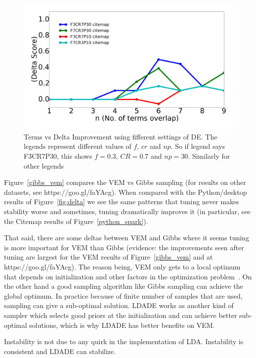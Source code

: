 \documentclass[twocolumn,5p,sort&compress]{elsarticle}
\theoremstyle{break}
\begin{document}
\begin{figure}[!t]
  \includegraphics[width=\linewidth]{./fig/citemap.png}
  \caption{Terms vs Delta Improvement using fifferent settings of DE. The legends represent different values of $f$, $cr$ and $np$. So if legend says F3CR7P30, this shows $f=0.3$, $CR=0.7$ and $np=30$. Similarly for other legends}
  \label{fig:RQ4}
\end{figure}

  Figure~\ref{gibbs_vem} compares the  VEM vs Gibbs sampling (for results on other datasets, see https://goo.gl/faYAcg). When compared with the Python/desktop results of
   Figure~\ref{fig:delta} we see the same patterns that tuning never makes stability worse and sometimes, tuning dramatically improves it (in particular, see the Citemap results
   of  Figure~\ref{python_spark}).

   That said, there are some deltas between VEM and Gibbs where it seems tuning
   is more important for VEM than Gibbs (evidence: the improvements seen after
   tuning are largest for the  VEM results of  Figure~\ref{gibbs_vem} and at  https://goo.gl/faYAcg). The reason being, VEM only gets to a local optimum that depends on initialization and other factors in the optimization problem~\cite{asuncion2009smoothing}. On the other hand a good sampling algorithm like Gibbs sampling can achieve the global optimum. In practice because of finite number of samples that are used, sampling can give a sub-optimal solution. LDADE works as another kind of sampler which selects good priors at the initialization and can achieve better sub-optimal solutions, which is why LDADE has better benefits on VEM.

\begin{lesson}
  Instability is not due to any quirk in the implementation of LDA. Instability is consistent and LDADE can stabilize. 
\end{lesson}
\end{document}
